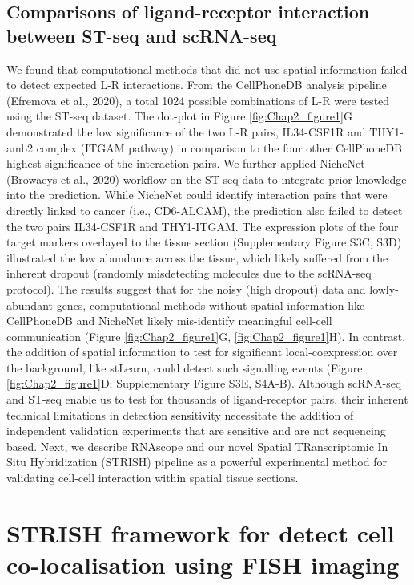 \subsection{Comparisons of ligand-receptor interaction between ST-seq and scRNA-seq}
We found that computational methods that did not use spatial information failed to detect expected L-R interactions. From the CellPhoneDB analysis pipeline (Efremova et al., 2020),  a total 1024 possible combinations of L-R were tested using the ST-seq dataset. The dot-plot in Figure \ref{fig:Chap2_figure1}G demonstrated the low significance of the two L-R pairs, IL34-CSF1R and THY1-amb2 complex (ITGAM pathway) in comparison to the four other CellPhoneDB highest significance of the interaction pairs. We further applied NicheNet (Browaeys et al., 2020) workflow on the ST-seq data to integrate prior knowledge into the prediction. While NicheNet could identify interaction pairs that were directly linked to cancer (i.e., CD6-ALCAM), the prediction also failed to detect the two pairs IL34-CSF1R and THY1-ITGAM. The expression plots of the four target markers overlayed to the tissue section (Supplementary Figure S3C, S3D) illustrated the low abundance across the tissue, which likely suffered from the inherent dropout (randomly misdetecting molecules due to the scRNA-seq protocol). The results suggest that for the noisy (high dropout) data and lowly-abundant genes, computational methods without spatial information like CellPhoneDB and NicheNet likely mis-identify meaningful cell-cell communication (Figure \ref{fig:Chap2_figure1}G, \ref{fig:Chap2_figure1}H). In contrast, the addition of spatial information to test for significant local-coexpression over the background, like stLearn, could detect such signalling events (Figure \ref{fig:Chap2_figure1}D; Supplementary Figure S3E, S4A-B). Although scRNA-seq and ST-seq enable us to test for thousands of ligand-receptor pairs, their inherent technical limitations in detection sensitivity necessitate the addition of independent validation experiments that are sensitive and are not sequencing based. Next, we describe RNAscope and our novel Spatial TRanscriptomic In Situ Hybridization (STRISH) pipeline as a powerful experimental method for validating cell-cell interaction within spatial tissue sections. 

\section{STRISH framework for detect cell co-localisation using FISH imaging}
\label{Sec:2.2_STRISH}	%

